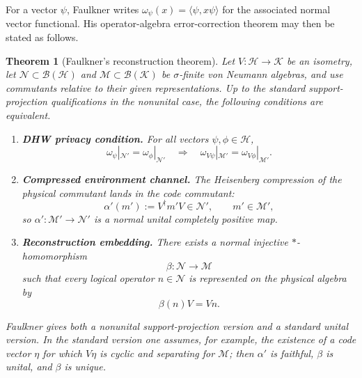 \documentclass[11pt]{article}
\newcommand{\mB}{\mathcal{B}}
\newcommand{\mM}{\mathcal{M}}
\newcommand{\mN}{\mathcal{N}}
\newcommand{\scrH}{\mathscr{H}}
\newcommand{\scrK}{\mathscr{K}}
\newtheorem{theorem}{Theorem}
\begin{document}
For a vector \(\psi\), Faulkner writes
\(\omega_\psi(x)=\langle\psi,x\psi\rangle\) for the associated normal vector
functional.  His operator-algebra error-correction theorem may then be stated
as follows.

\begin{theorem}[Faulkner's reconstruction theorem]
\label{thm:faulkner-oa-qec}
Let \(V:\scrH\to\scrK\) be an isometry, let
\(\mN\subset\mB(\scrH)\) and \(\mM\subset\mB(\scrK)\) be
\(\sigma\)-finite von Neumann algebras, and use commutants relative to their
given representations.  Up to the standard support-projection qualifications
in the nonunital case, the following conditions are equivalent.

\begin{enumerate}
    \item \textbf{DHW privacy condition.}  For all vectors
    \(\psi,\phi\in\scrH\),
    \begin{equation}
        \omega_\psi|_{\mN'}=\omega_\phi|_{\mN'}
        \quad\Longrightarrow\quad
        \omega_{V\psi}|_{\mM'}=\omega_{V\phi}|_{\mM'} .
        \label{eq:faulkner-dhw}
    \end{equation}

    \item \textbf{Compressed environment channel.}  The Heisenberg compression
    of the physical commutant lands in the code commutant:
    \begin{equation}
        \alpha'(m'):=V^\dagger m'V\in\mN',
        \qquad
        m'\in\mM',
        \label{eq:faulkner-alpha-prime}
    \end{equation}
    so \(\alpha':\mM'\to\mN'\) is a normal unital completely positive map.

    \item \textbf{Reconstruction embedding.}  There exists a normal injective
    \(*\)-homomorphism
    \begin{equation}
        \beta:\mN\longrightarrow \mM
        \label{eq:faulkner-beta}
    \end{equation}
    such that every logical operator \(n\in\mN\) is represented on the
    physical algebra by
    \begin{equation}
        \beta(n)V=Vn.
        \label{eq:faulkner-intertwining}
    \end{equation}
\end{enumerate}
Faulkner gives both a nonunital support-projection version and a standard
unital version.  In the standard version one assumes, for example, the
existence of a code vector \(\eta\) for which \(V\eta\) is cyclic and
separating for \(\mM\); then \(\alpha'\) is faithful, \(\beta\) is unital, and
\(\beta\) is unique.
\end{theorem}
\end{document}
